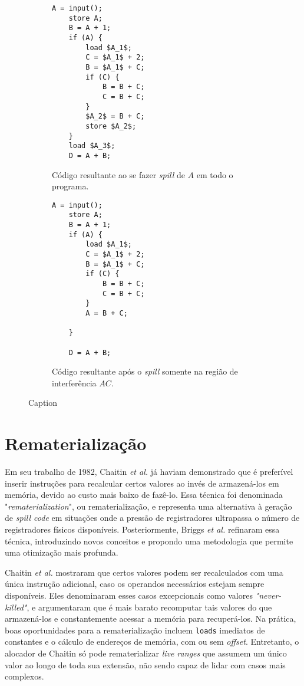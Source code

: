 \documentclass[
	12pt,				%
	openright,			%
	oneside,			%
	a4paper,			%
	tccpreliminar,			%
	]{ABNT-DC-UEL}
\begin{document}
\begin{figure}
    \centering
    \begin{subfigure}{0.45\textwidth}
        \centering
        \begin{lstlisting}[mathescape=true]
    A = input();
    store A;
    B = A + 1;
    if (A) {
        load $A_1$;
        C = $A_1$ + 2;
        B = $A_1$ + C;
        if (C) {
            B = B + C;
            C = B + C;
        }
        $A_2$ = B + C;
        store $A_2$;
    }
    load $A_3$;
    D = A + B;
        \end{lstlisting}
        \caption{Código resultante ao se fazer \textit{spill} de $A$ em todo o programa.}
        \label{bergner-5}
    \end{subfigure}
    \begin{subfigure}{0.45\textwidth}
        \centering
        \begin{lstlisting}[mathescape=true]
    A = input();
    store A;
    B = A + 1;
    if (A) {
        load $A_1$;
        C = $A_1$ + 2;
        B = $A_1$ + C;
        if (C) {
            B = B + C;
            C = B + C;
        }
        A = B + C;
        
    }
    
    D = A + B;
        \end{lstlisting}
        \caption{Código resultante após o \textit{spill} somente na região de interferência $AC$.}
        \label{bergner-6}
    \end{subfigure}
    \caption{Caption}
\end{figure}

\section{Rematerialização}

Em seu trabalho de 1982, Chaitin \textit{et al.} \cite{chaitin:82} já haviam demonstrado que é preferível inserir instruções para recalcular certos valores ao invés de armazená-los em memória, devido ao custo mais baixo de fazê-lo. Essa técnica foi denominada "\textit{rematerialization}", ou rematerialização, e representa uma alternativa à geração de \textit{spill code} em situações onde a pressão de registradores ultrapassa o número de registradores físicos disponíveis. Posteriormente, Briggs \textit{et al.} \cite{briggs2:92} refinaram essa técnica, introduzindo novos conceitos e propondo uma metodologia que permite uma otimização mais profunda.

Chaitin \textit{et al.} mostraram que certos valores podem ser recalculados com uma única instrução adicional, caso os operandos necessários estejam sempre disponíveis. Eles denominaram esses casos excepcionais como valores \textit{"never-killed"}, e argumentaram que é mais barato recomputar tais valores do que armazená-los e constantemente acessar a memória para recuperá-los. Na prática, boas oportunidades para a rematerialização incluem \texttt{loads} imediatos de constantes e o cálculo de endereços de memória, com ou sem \textit{offset}. Entretanto, o alocador de Chaitin só pode rematerializar \textit{live ranges} que assumem um único valor ao longo de toda sua extensão, não sendo capaz de lidar com casos mais complexos.
\end{document}
